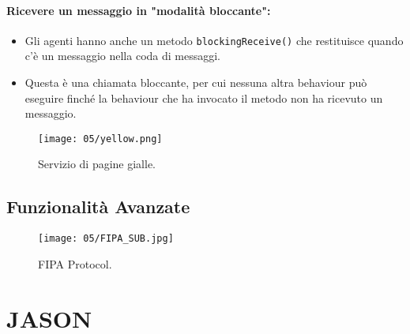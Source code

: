 \paragraph{Ricevere un messaggio in "modalità bloccante":}

\begin{itemize}
  \item Gli agenti hanno anche un metodo \texttt{blockingReceive()} che restituisce quando c'è un messaggio nella coda di messaggi.
  \item Questa è una chiamata bloccante, per cui nessuna altra behaviour può eseguire finché la behaviour che ha invocato il metodo non ha ricevuto un messaggio.
\end{itemize}



\begin{figure}[!h]
    \centering
    \texttt{[image: 05/yellow.png]}
  \caption{Servizio di pagine gialle.}
\end{figure}

\pagebreak

\subsection{Funzionalità Avanzate}


\begin{figure}[!h]
    \centering
    \texttt{[image: 05/FIPA\_SUB.jpg]}
  \caption{FIPA Protocol.}
\end{figure}

\section{JASON}
